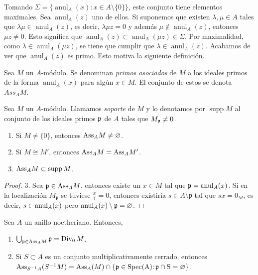 \documentclass[../main.tex]{subfiles}
\begin{document}
Tomando $\Sigma=\{\operatorname{anul}_A(x):x\in A\setminus\{0\}\}$, este conjunto tiene elementos maximales. Sea $\operatorname{anul}_A(z)$ uno de ellos. Si suponemos que existen $\lambda,\mu\in A$ tales que $\lambda\mu\in\operatorname{anul}_A(z)$, es decir, $\lambda\mu z=0$ y además $\mu\notin\operatorname{anul}_A(z)$, entonces $\mu z\neq0$. Esto significa que $\operatorname{anul}_A(z)\subset\operatorname{anul}_A(\mu z)\in\Sigma$. Por maximalidad, como $\lambda\in\operatorname{anul}_A(\mu z)$, se tiene que cumplir que $\lambda\in\operatorname{anul}_A(z)$. Acabamos de ver que $\operatorname{anul}_A(z)$ es primo. Esto motiva la siguiente definición.
\begin{definition}
Sea $M$ un $A$-módulo. Se denominan \textit{primos asociados} de $M$ a los ideales primos de la forma $\operatorname{anul}_A(x)$ para algún $x\in M$. El conjunto de estos se denota $Ass_AM$.
\end{definition}
\begin{definition}
Sea $M$ un $A$-módulo. Llamamos \textit{soporte} de $M$ y lo denotamos por $\operatorname{supp} M$ al conjunto de los ideales primos $\mathfrak{p}$ de $A$ tales que $M_{\mathfrak{p}}\neq 0$.
\end{definition}
\begin{lemma}
\begin{enumerate}
    \item Si $M\neq\{0\}$, entonces $\text{Ass}_AM\neq\varnothing$.
    \item Si $M\cong M'$, entonces $\text{Ass}_AM=\text{Ass}_AM'$.
    \item $\text{Ass}_AM\subset\operatorname{supp}M$.
\end{enumerate}
\end{lemma}
\begin{proof}
  3. Sea $\mathfrak{p}\in \text{Ass}_A M$, entonces existe un $x\in M$ tal que $\mathfrak{p} = \operatorname{anul}_A(x)$. Si en la localización $M_\mathfrak{p}$ se tuviese $\frac{x}{1} = 0$, entonces existiría $s\in A\setminus \mathfrak{p}$ tal que $sx = 0_M$, es decir, $s\in \operatorname{anul}_A(x)$ pero $ \operatorname{anul}_A(x) \setminus \mathfrak{p} = \varnothing$.
\end{proof}

\begin{proposition}
Sea $A$ un anillo noetheriano. Entonces,\begin{enumerate}
    \item $\bigcup_{\mathfrak{p}\in\text{Ass}_AM}\mathfrak{p}=\operatorname{Div}_0M$.
    \item Si $S\subset A$ es un conjunto multiplicativamente cerrado, entonces $\text{Ass}_{S^{-1}A}(S^{-1}M)=\text{Ass}_A(M)\cap\{\mathfrak{p}\in\operatorname{Spec(A):\mathfrak{p}\cap S=\varnothing}\}$.
\end{enumerate}
\end{proposition}
\end{document}
